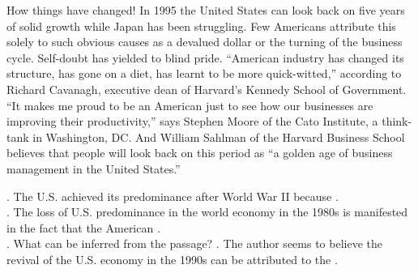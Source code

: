 How things have changed! In 1995 the United States can look back on five years of solid growth while Japan has been struggling. Few Americans attribute this solely to such obvious causes as a devalued dollar or the turning of the business cycle. Self-doubt has yielded to blind pride. “American industry has changed its structure, has gone on a diet, has learnt to be more quick-witted,” according to Richard Cavanagh, executive dean of Harvard’s Kennedy School of Government. “It makes me proud to be an American just to see how our businesses are improving their productivity,” says Stephen Moore of the Cato Institute, a think-tank in Washington, DC. And William Sahlman of the Harvard Business School believes that people will look back on this period as “a golden age of business management in the United States.”
\begin{questions}  .	The U.S. achieved its predominance after World War II because \ltk{}.\\
  .	The loss of U.S. predominance in the world economy in the 1980s is manifested in the fact that the American \ltk{}.\\
  .	What can be inferred from the passage?
  .	The author seems to believe the revival of the U.S. economy in the 1990s can be attributed to the \ltk{}.\\
\end{questions}   

